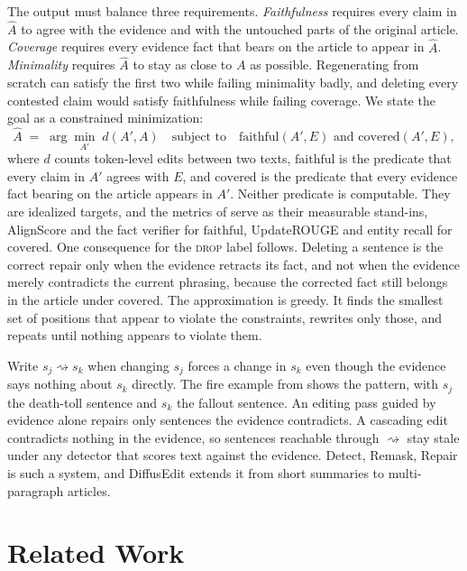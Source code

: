 \documentclass[]{paper}
\newcommand{\drop}{\textsc{drop}}
\begin{document}
The output must balance three requirements. \emph{Faithfulness} requires every claim in $\hat{A}$ to agree with the evidence and with the untouched parts of the original article. \emph{Coverage} requires every evidence fact that bears on the article to appear in $\hat{A}$. \emph{Minimality} requires $\hat{A}$ to stay as close to $A$ as possible. Regenerating from scratch can satisfy the first two while failing minimality badly, and deleting every contested claim would satisfy faithfulness while failing coverage. We state the goal as a constrained minimization:
\begin{equation}
\hat{A} \;=\; \arg\min_{A'} \; d(A', A)
\quad \text{subject to} \quad
\mathrm{faithful}(A', E) \text{ and } \mathrm{covered}(A', E),
\label{eq:objective}
\end{equation}
where $d$ counts token-level edits between two texts, $\mathrm{faithful}$ is the predicate that every claim in $A'$ agrees with $E$, and $\mathrm{covered}$ is the predicate that every evidence fact bearing on the article appears in $A'$. Neither predicate is computable. They are idealized targets, and the metrics of  serve as their measurable stand-ins, AlignScore and the fact verifier for $\mathrm{faithful}$, UpdateROUGE and entity recall for $\mathrm{covered}$. One consequence for the \drop{} label follows. Deleting a sentence is the correct repair only when the evidence retracts its fact, and not when the evidence merely contradicts the current phrasing, because the corrected fact still belongs in the article under $\mathrm{covered}$. The approximation is greedy. It finds the smallest set of positions that appear to violate the constraints, rewrites only those, and repeats until nothing appears to violate them.

Write $s_j \rightsquigarrow s_k$ when changing $s_j$ forces a change in $s_k$ even though the evidence says nothing about $s_k$ directly. The fire example from  shows the pattern, with $s_j$ the death-toll sentence and $s_k$ the fallout sentence. An editing pass guided by evidence alone repairs only sentences the evidence contradicts. A cascading edit contradicts nothing in the evidence, so sentences reachable through $\rightsquigarrow$ stay stale under any detector that scores text against the evidence. Detect, Remask, Repair \citep{zou-etal-2026-detect} is such a system, and DiffusEdit extends it from short summaries to multi-paragraph articles.

\section{Related Work}
\label{sec:related}
\end{document}
